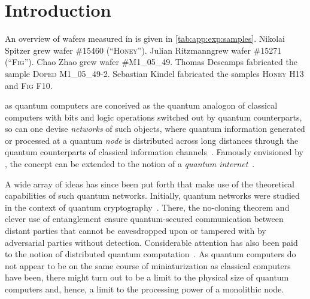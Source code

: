 \chapter{Introduction}\label{ch:exp:introduction}

\begin{partcontribs}
    An overview of wafers measured in \thispart is given in \cref{tab:app:exp:samples}.
    Nikolai Spitzer\sidenote[a]{\RUB} grew wafer \textsc{\#15460 (\enquote{Honey})}.
    Julian Ritzmann\sidenotemark[a] grew wafer \textsc{\#15271 (\enquote{Fig})}.
    Chao Zhao grew wafer \textsc{\#M1\_05\_49}.
    Thomas Descamps fabricated the sample \textsc{Doped M1\_05\_49-2}.
    Sebastian Kindel\sidenote[d]{\RWTHFZJ} fabricated the samples \textsc{Honey H13} and \textsc{Fig F10}.
\end{partcontribs}

 as quantum computers are conceived as the quantum analogon of classical computers with bits and logic operations switched out by quantum counterparts, so can one devise \emph{networks} of such objects, where quantum information generated or processed at a quantum \emph{node} is distributed across long distances through the quantum counterparts of classical information channels~\cite{Nielsen2011,Simon2017}.
Famously envisioned by \textcite{Kimble2008}, the concept can be extended to the notion of a \emph{quantum internet}~\cite{Wehner2018}.

A wide array of ideas has since been put forth that make use of the theoretical capabilities of such quantum networks.
Initially, quantum networks were studied in the context of quantum cryptography~\cite{Bennett1984,Ekert1991,Deutsch1996,Gisin2002}.
There, the no-cloning theorem and clever use of entanglement ensure quantum-secured communication between distant parties that cannot be eavesdropped upon or tampered with by adversarial parties without detection.
Considerable attention has also been paid to the notion of distributed quantum computation~\cite{Cirac1999}.
As quantum computers do not appear to be on the same course of miniaturization as classical computers have been, there might turn out to be a limit to the physical size of quantum computers and, hence, a limit to the processing power of a monolithic node.

